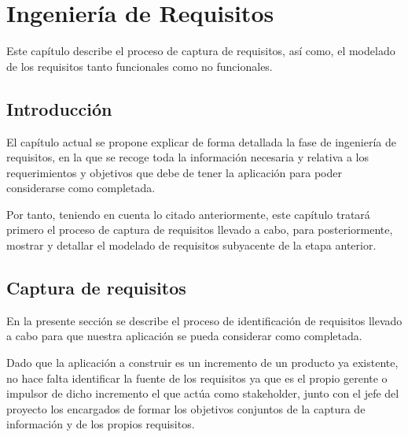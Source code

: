 
\chapter{Ingeniería de Requisitos}
	
Este capítulo describe el proceso de captura de requisitos, así como, el modelado de los requisitos tanto funcionales como no funcionales.
	
\minitoc
	
\section{Introducción}
		
El capítulo actual se propone explicar de forma detallada la fase de ingeniería de requisitos, en la que se recoge toda la información necesaria y relativa a los requerimientos y objetivos que debe de tener la aplicación para poder considerarse como completada.
		
Por tanto, teniendo en cuenta lo citado anteriormente, este capítulo tratará primero el proceso de captura de requisitos llevado a cabo, para posteriormente, mostrar y detallar el modelado de requisitos subyacente de la etapa anterior.
		
\section{Captura de requisitos}
		
En la presente sección se describe el proceso de identificación de requisitos llevado a cabo para que nuestra aplicación se pueda considerar como completada.

		
Dado que la aplicación a construir es un incremento de un producto ya existente, no hace falta identificar la fuente de los requisitos ya que es el propio gerente o impulsor de dicho incremento el que actúa como stakeholder, junto con el jefe del proyecto los encargados de formar los objetivos conjuntos de la captura de información y de los propios requisitos.

